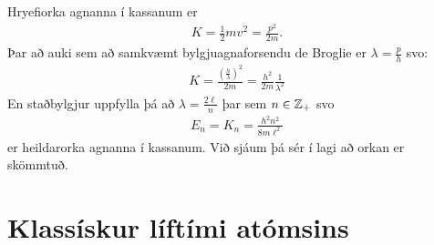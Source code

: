 \ifdefined \wholebook \else\documentclass[oneside]{book}\usepackage{EdlBook}\graphicspath{{figures/}}
\begin{document}
Hryefiorka agnanna í kassanum er
\begin{align*}
    K = \frac{1}{2}mv^2 = \frac{p^2}{2m}.
\end{align*}
Þar að auki sem að samkvæmt bylgjuagnaforsendu de Broglie er $\lambda = \frac{p}{h}$ svo:
\begin{align*}
    K = \frac{\left( \frac{h}{\lambda} \right)^2}{2m} = \frac{h^2}{2m} \frac{1}{\lambda^2}
\end{align*}
En staðbylgjur uppfylla þá að $\lambda = \frac{2\ell}{n}$ þar sem $n \in \mathbb{Z}_+$ svo 
\begin{align*}
    E_n = K_n = \frac{h^2 n^2}{8m\ell^2}
\end{align*}
er heildarorka agnanna í kassanum. Við sjáum þá sér í lagi að orkan er skömmtuð. 

\section{Klassískur líftími atómsins}
\end{document}
